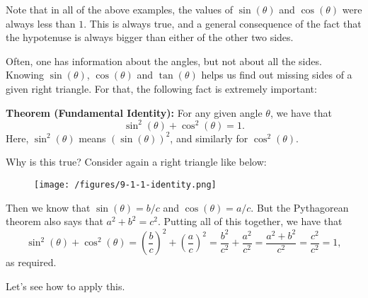 \documentclass{ximera}
\begin{document}
\begin{remark}
  Note that in all of the above examples, the values of $\sin(\theta)$ and $\cos(\theta)$ were always less than $1$. This is always true, and a general consequence of the fact that the hypotenuse is always bigger than either of the other two sides.
\end{remark}

Often, one has information about the angles, but not about all the sides. Knowing $\sin(\theta)$, $\cos(\theta)$ and $\tan(\theta)$ helps us find out missing sides of a given right triangle. For that, the following fact is extremely important:

\begin{callout}
  {\bf Theorem (Fundamental Identity):} For any given angle $\theta$, we have that $$\sin^2(\theta) + \cos^2(\theta) =1.$$Here, $\sin^2(\theta)$ means $(\sin(\theta))^2$, and similarly for $\cos^2(\theta)$.
\end{callout}

Why is this true? Consider again a right triangle like below:

\begin{figure}[h]
  \centering
  \texttt{[image: /figures/9-1-1-identity.png]}
\end{figure}


Then we know that $\sin(\theta) = b/c$ and $\cos(\theta) = a/c$. But the Pythagorean theorem also says that $a^2+b^2=c^2$. Putting all of this together, we have that $$\sin^2(\theta) + \cos^2(\theta) = \left(\frac{b}{c}\right)^2 + \left(\frac{a}{c}\right)^2 = \frac{b^2}{c^2}+\frac{a^2}{c^2} = \frac{a^2+b^2}{c^2} = \frac{c^2}{c^2} = 1,$$as required.

Let's see how to apply this.
\end{document}
